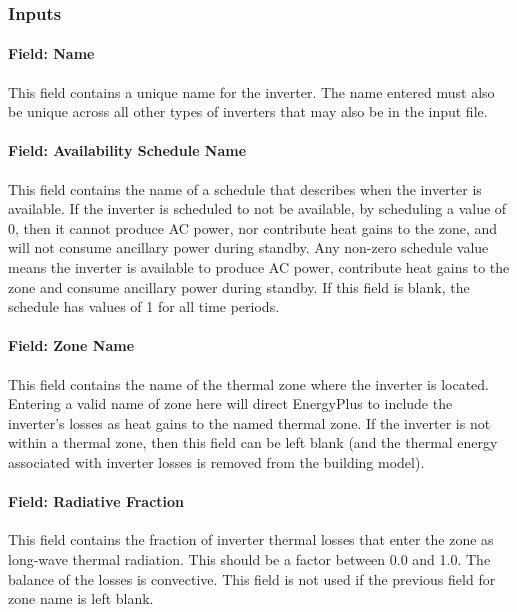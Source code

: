 \subsubsection{Inputs}\label{inputs-4-009}

\paragraph{Field: Name}\label{field-name-3-009}

This field contains a unique name for the inverter. The name entered must also be unique across all other types of inverters that may also be in the input file.

\paragraph{Field: Availability Schedule Name}\label{field-availability-schedule-name-2-001}

This field contains the name of a schedule that describes when the inverter is available. If the inverter is scheduled to not be available, by scheduling a value of 0, then it cannot produce AC power, nor contribute heat gains to the zone, and will not consume ancillary power during standby. Any non-zero schedule value means the inverter is available to produce AC power, contribute heat gains to the zone and consume ancillary power during standby. If this field is blank, the schedule has values of 1 for all time periods.

\paragraph{Field: Zone Name}\label{field-zone-name-2-001}

This field contains the name of the thermal zone where the inverter is located. Entering a valid name of zone here will direct EnergyPlus to include the inverter's losses as heat gains to the named thermal zone. If the inverter is not within a thermal zone, then this field can be left blank (and the thermal energy associated with inverter losses is removed from the building model).

\paragraph{Field: Radiative Fraction}\label{field-radiative-fraction-2}

This field contains the fraction of inverter thermal losses that enter the zone as long-wave thermal radiation. This should be a factor between 0.0 and 1.0. The balance of the losses is convective. This field is not used if the previous field for zone name is left blank.

